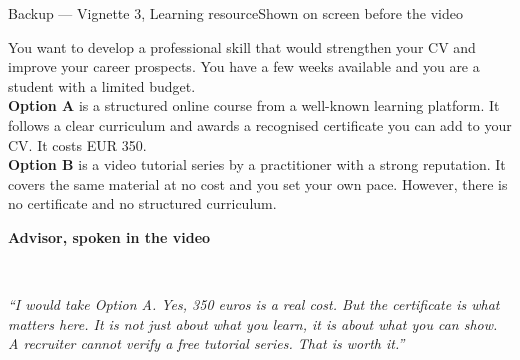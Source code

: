 \documentclass[aspectratio=169,10pt]{beamer}
\newcommand{\panelhead}[1]{\noindent\colorbox{kncyan}{\parbox{0.96\textwidth}{\centering\vspace{1pt}\color{white}\scriptsize\bfseries #1\vspace{1pt}}}\\[0.25em]}
\begin{document}
\begin{frame}{Backup — Vignette 3, Learning resource}{Shown on screen before the video}
  \vspace{0.4em}
  \noindent\colorbox{knlight}{\parbox{0.975\textwidth}{\vspace{3pt}\scriptsize
  You want to develop a professional skill that would strengthen your CV and improve your career prospects. You have a few weeks available and you are a student with a limited budget.\\[0.5em]
  \textbf{Option A} is a structured online course from a well-known learning platform. It follows a clear curriculum and awards a recognised certificate you can add to your CV. It costs EUR 350.\\[0.5em]
  \textbf{Option B} is a video tutorial series by a practitioner with a strong reputation. It covers the same material at no cost and you set your own pace. However, there is no certificate and no structured curriculum.\vspace{3pt}}}
  \vspace{0.8em}

  \panelhead{Advisor, spoken in the video}
  \noindent\colorbox{knpale}{\parbox{0.975\textwidth}{\vspace{3pt}\scriptsize\itshape
  ``I would take Option A. Yes, 350 euros is a real cost. But the certificate is what matters here. It is not just about what you learn, it is about what you can show. A recruiter cannot verify a free tutorial series. That is worth it.''\vspace{3pt}}}
  \scriptlegend
\end{frame}
\end{document}
